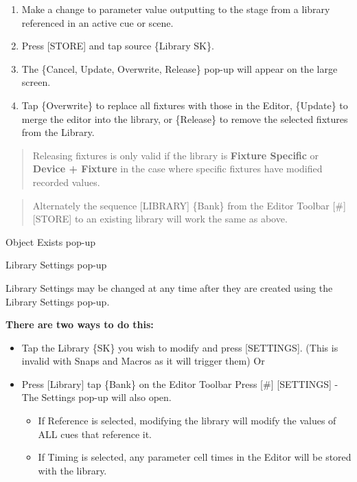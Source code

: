 \documentclass[
]{article}
\begin{document}
\begin{enumerate}
\def\labelenumi{\arabic{enumi}.}
\item
  Make a change to parameter value outputting to the stage from a library referenced in an active cue or scene.
\item
  Press {[}STORE{]} and tap source \{Library SK\}.
\item
  The \{Cancel, Update, Overwrite, Release\} pop-up will appear on the large screen.
\item
  Tap \{Overwrite\} to replace all fixtures with those in the Editor, \{Update\} to merge the editor into the library, or \{Release\} to remove the selected fixtures from the Library.
\end{enumerate}

\begin{quote}
Releasing fixtures is only valid if the library is \textbf{Fixture Specific} or \textbf{Device + Fixture} in the case where specific fixtures have modified recorded values.
\end{quote}

\begin{quote}
Alternately the sequence {[}LIBRARY{]} \{Bank\} from the Editor Toolbar {[}\#{]} {[}STORE{]} to an existing library will work the same as above.
\end{quote}

Object Exists pop-up

Library Settings pop-up

Library Settings may be changed at any time after they are created using the Library Settings pop-up.

\textbf{There are two ways to do this:}

\begin{itemize}
\item
  Tap the Library \{SK\} you wish to modify and press {[}SETTINGS{]}. (This is invalid with Snaps and Macros as it will trigger them) Or
\item
  Press {[}Library{]} tap \{Bank\} on the Editor Toolbar Press {[}\#{]} {[}SETTINGS{]} - The Settings pop-up will also open.

  \begin{itemize}
  \item
    If Reference is selected, modifying the library will modify the values of ALL cues that reference it.
  \item
    If Timing is selected, any parameter cell times in the Editor will be stored with the library.
  \end{itemize}
\end{itemize}
\end{document}
